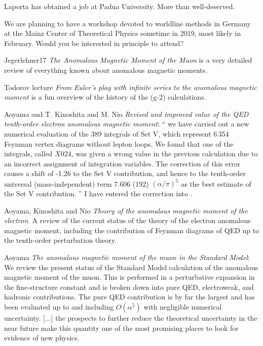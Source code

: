 \begin{description}
Laporta has obtained a job at Padua University. More than well-deserved.

\item[2018-01-08 Christian Schubert]
We are planning to have a workshop devoted to worldline methods in
Germany at the Mainz Center of Theoretical Physics sometime in 2019, most
likely in February. Would you be interested in principle to attend?

\item[2018-06-02 Predrag]
Jegerlehner17
{\em The Anomalous Magnetic Moment of the Muon}
is a very detailed review of everything known about anomalous
magnetic moments.

Todorov lecture {\em From {Euler}'s play with infinite series to
the anomalous magnetic moment} is a fun overview of the history of the (g-2)
calculations.

\item[2018-06-02 Predrag]
Aoyama and T. Kinoshita and M. Nio {\em Revised and improved value
of the {QED} tenth-order electron anomalous magnetic moment}:
``
we have carried out a new numerical evaluation of the 389 integrals of Set V,
which represent 6\,354 Feynman vertex diagrams without lepton loops. We found
that one of the integrals, called $X024$, was given a wrong value in the
previous calculation due to an incorrect assignment of integration variables.
The correction of this error causes a shift of -1.26 to the Set V contribution,
and hence to the tenth-order universal (mass-independent) term 7.606
(192) $(\alpha/{\pi})^5$ as the best estimate of the Set V contribution.
''
I have entered the correction into .

\item[2018-11-27 Predrag]
Aoyama, Kinoshita and Nio
{\em Theory of the anomalous magnetic moment of the electron}.
A review of the current status of the theory of the electron anomalous
magnetic moment, including the contribution of Feynman diagrams of QED up
to the tenth-order perturbation theory.

\item[2020-06-15 Predrag]
Aoyama \etal{}
{\em The anomalous magnetic moment of the muon in the {Standard Model}}:
We review the present status of the Standard Model calculation of the
anomalous magnetic moment of the muon. This is performed in a
perturbative expansion in the fine-structure constant and is broken down
into pure QED, electroweak, and hadronic contributions. The pure QED
contribution is by far the largest and has been evaluated up to and
including $O(\alpha^5)$ with negligible numerical uncertainty. [...] the
prospects to further reduce the theoretical uncertainty in the near
future make this quantity one of the most promising places to look for
evidence of new physics.


\end{description}
